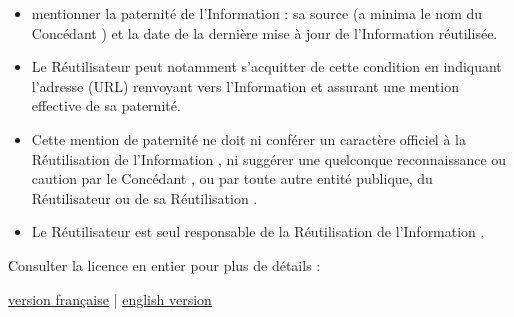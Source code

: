\begin{itemize}
        \item mentionner la paternité de l'\og Information \fg{} : sa source (a minima le nom du \og Concédant \fg{}) et la date de la dernière mise à jour de l'\og Information \fg{} réutilisée. 
        \item Le \og Réutilisateur \fg{} peut notamment s'acquitter de cette condition en indiquant l'adresse (URL) renvoyant vers \og l'Information \fg{} et assurant une mention effective de sa paternité.
        \item Cette mention de paternité ne doit ni conférer un caractère officiel à la \og Réutilisation \fg{} de l'\og Information \fg{}, ni suggérer une quelconque reconnaissance ou caution par le \og Concédant \fg{}, ou par toute autre entité publique, du \og Réutilisateur \fg{} ou de sa \og Réutilisation \fg{}.
        \item Le \og Réutilisateur \fg{} est seul responsable de la \og Réutilisation \fg{} de l'\og Information \fg{}.
\end{itemize}

\bigskip

\begin{center}
    Consulter la licence en entier pour plus de détails :
    
    \href{https://www.etalab.gouv.fr/wp-content/uploads/2017/04/ETALAB-Licence-Ouverte-v2.0.pdf}{version française} | \href{https://www.etalab.gouv.fr/wp-content/uploads/2018/11/open-licence.pdf}{english version} 
\end{center}
